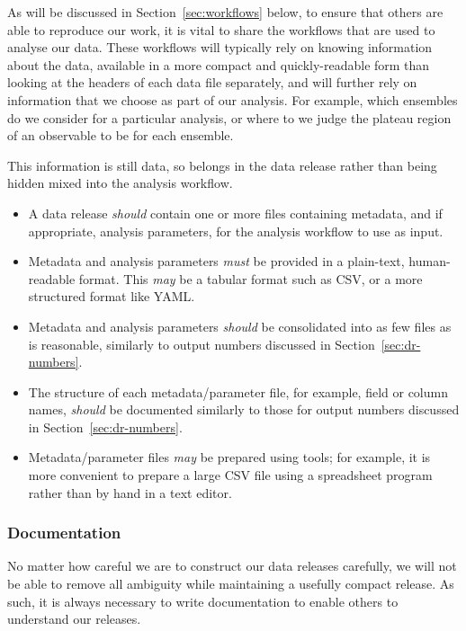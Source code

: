 \documentclass{article}
\newcommand\rfcword[1]{\emph{#1}\xspace}
\newcommand\must{\rfcword{must}}
\newcommand\should{\rfcword{should}}
\newcommand\may{\rfcword{may}}
\begin{document}
As will be discussed in Section~\ref{sec:workflows} below,
to ensure that others are able to reproduce our work,
it is vital to share the workflows that are used to analyse our data.
These workflows will typically rely on knowing information about the data,
available in a more compact and quickly-readable form than
looking at the headers of each data file separately,
and will further rely on information that we choose as part of our analysis.
For example,
which ensembles do we consider for a particular analysis,
or where to we judge the plateau region of an observable to be for each ensemble.

This information is still data,
so belongs in the data release rather than being hidden mixed into the analysis workflow.

\begin{itemize}
  \item
        A data release \should contain one or more files containing metadata,
        and if appropriate,
        analysis parameters,
        for the analysis workflow to use as input.
  \item
        Metadata and analysis parameters \must be provided in a plain-text,
        human-readable format.
        This \may be a tabular format such as CSV,
        or a more structured format like YAML\@.
  \item
        Metadata and analysis parameters \should be consolidated into as few files as is reasonable,
        similarly to output numbers discussed in Section~\ref{sec:dr-numbers}.
  \item
        The structure of each metadata/parameter file,
        for example,
        field or column names,
        \should be documented similarly to those for output numbers
        discussed in Section~\ref{sec:dr-numbers}.
  \item
        Metadata/parameter files \may be prepared using tools;
        for example,
        it is more convenient to prepare a large CSV file using a spreadsheet program
        rather than by hand in a text editor.
\end{itemize}


\subsubsection{Documentation}\label{sec:dr-documentation}

No matter how careful we are to construct our data releases carefully,
we will not be able to remove all ambiguity while maintaining a usefully compact release.
As such,
it is always necessary to write documentation
to enable others to understand our releases.
\end{document}
